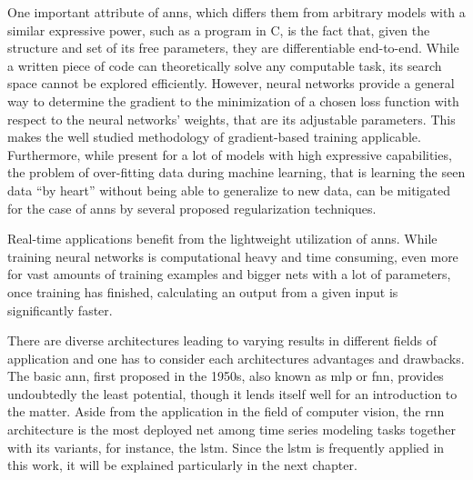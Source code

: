 One important attribute of \glspl{ann}, which differs them from arbitrary models with a similar expressive power, such as a program in C, is the fact that, given the structure and set of its free parameters, they are differentiable end-to-end.
While a written piece of code can theoretically solve any computable task, its search space cannot be explored efficiently.
However, neural networks provide a general way to determine the gradient to the minimization of a chosen loss function with respect to the neural networks' weights, that are its adjustable parameters.
This makes the well studied methodology of gradient-based training applicable.
Furthermore, while present for a lot of models with high expressive capabilities, the problem of over-fitting data during machine learning, that is learning the seen data ``by heart'' without being able to generalize to new data, can be mitigated for the case of \glspl{ann} by several proposed regularization techniques.   

Real-time applications benefit from the lightweight utilization of \glspl{ann}.
While training neural networks is computational heavy and time consuming, even more for vast amounts of training examples and bigger nets with a lot of parameters, once training has finished, calculating an output from a given input is significantly faster.

There are diverse architectures leading to varying results in different fields of application and one has to consider each architectures advantages and drawbacks.
The basic \gls{ann}, first proposed in the 1950s, also known as \gls{mlp} or \gls{fnn}, provides undoubtedly the least potential, though it lends itself well for an introduction to the matter.
Aside from the application in the field of computer vision, the \gls{rnn} architecture is the most deployed net among time series modeling tasks together with its variants, for instance, the \gls{lstm}.
Since the \gls{lstm} is frequently applied in this work, it will be explained particularly in the next chapter.
%

